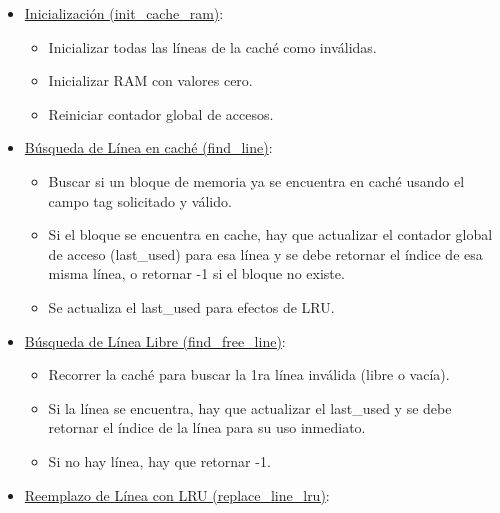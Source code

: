 \documentclass{article}
\begin{document}
\begin{itemize}

    \item {\underline{Inicialización (init\_cache\_ram)}:}

        \begin{itemize}
            \item Inicializar todas las líneas de la caché como inválidas.
            \item Inicializar RAM con valores cero.
            \item Reiniciar contador global de accesos.
        \end{itemize}

    \quad


    \item {\underline{Búsqueda de Línea en caché (find\_line)}:}

        \begin{itemize}
            \item Buscar si un bloque de memoria ya se encuentra en caché usando el campo tag solicitado y válido.
            \item Si el bloque se encuentra en cache, hay que actualizar el contador global de acceso (last\_used) para esa línea y se debe retornar el índice de esa misma línea, o  retornar -1 si el bloque no existe.
            \item Se actualiza el last\_used para efectos de LRU.
        \end{itemize}

    \quad
    
    \item {\underline{Búsqueda de Línea Libre (find\_free\_line)}:}

        \begin{itemize}
            \item Recorrer la caché para buscar la 1ra línea inválida (libre o vacía).
            \item Si la línea se encuentra, hay que actualizar el last\_used y se debe retornar el índice de la línea para su uso inmediato.
            \item Si no hay línea, hay que retornar -1.
        \end{itemize}

    \quad

    \item {\underline{Reemplazo de Línea con LRU (replace\_line\_lru)}:}


\end{itemize}
\end{document}
